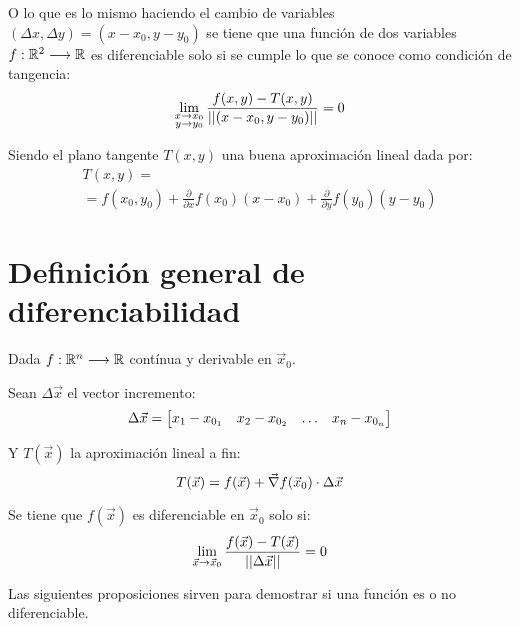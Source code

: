 \documentclass[a5paper,12pt,twoside]{book}
\begin{document}
O lo que es lo mismo haciendo el cambio de variables $(\Delta x,\Delta y)=(x-x_0,y-y_0)$ se tiene que una función de dos variables $f:\mathbb{R}^2 \longrightarrow \mathbb{R}$ es diferenciable solo si se cumple lo que se conoce como condición de tangencia:
\begin{equation*}
    \lim_{\substack{x \to x_0 \\ y \to y_0}} \frac{f(x,y) - T(x,y)}{{\left|\left| {(x-x_0,y-y_0)} \right|\right|}} = 0
\end{equation*}

Siendo el plano tangente $T(x,y)$ una buena aproximación lineal dada por:
\begin{multline*}
    T(x,y) =
    \\
    = f(x_0,y_0) + \frac{\partial}{\partial x} f(x_0) \left(x-x_0\right) + \frac{\partial}{\partial y} f(y_0) \left(y-y_0\right)
\end{multline*}


\section{Definición general de diferenciabilidad}

Dada $f:\mathbb{R}^n \longrightarrow \mathbb{R}$ contínua y derivable en $\Vec{x}_0$.

Sean $\Delta \Vec{x}$ el vector incremento:
\begin{equation*}
    \Delta \Vec{x} = \begin{bmatrix} x_1-x_{0_1} & x_2-x_{0_2} & \dots & x_n-x_{0_n} \end{bmatrix}
\end{equation*}

Y $T(\Vec{x})$ la aproximación lineal a fin:
\begin{equation*}
    T(\Vec{x}) = f(\Vec{x}) + \Vec{\nabla} f(\Vec{x}_0) \cdot \Delta \Vec{x}
\end{equation*}

Se tiene que $f(\Vec{x})$ es diferenciable en $\Vec{x}_0$ solo si:
\begin{equation*}
    \lim_{\Vec{x} \to \Vec{x}_0} \frac{f(\Vec{x})-T(\Vec{x})}{{\left|\left| {\Delta \Vec{x}} \right|\right|}} = 0
\end{equation*}

Las siguientes proposiciones sirven para demostrar si una función es o no diferenciable.
\end{document}
